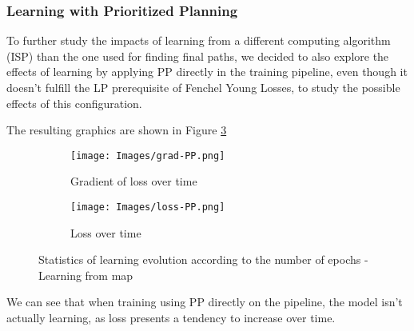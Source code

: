 \subsubsection{Learning with Prioritized Planning}


To further study the impacts of learning from a different computing algorithm (ISP) than the one used for finding final paths, we decided to also explore the effects of learning by applying PP directly in the training pipeline, even though it doesn't fulfill the LP prerequisite of Fenchel Young Losses, to study the possible effects of this configuration.

The resulting graphics are shown in Figure \ref{fig:loss-graph-PP}

\begin{figure}[!ht]
    \centering
    \begin{subfigure}[b]{0.45\textwidth}
        \texttt{[image: Images/grad-PP.png]}
        \caption{Gradient of loss over time}
        \label{fig:grad-loss-PP}
    \end{subfigure}
    \hspace{0.01\textwidth}
    \begin{subfigure}[b]{0.45\textwidth}
        \texttt{[image: Images/loss-PP.png]}
        \caption{Loss over time}
        \label{fig:loss-PP}
    \end{subfigure}    
    \caption{Statistics of learning evolution according to the number of epochs - Learning from map}
    \label{fig:loss-graph-PP}
\end{figure}

We can see that when training using PP directly on the pipeline, the model isn't actually learning, as loss presents a tendency to increase over time.